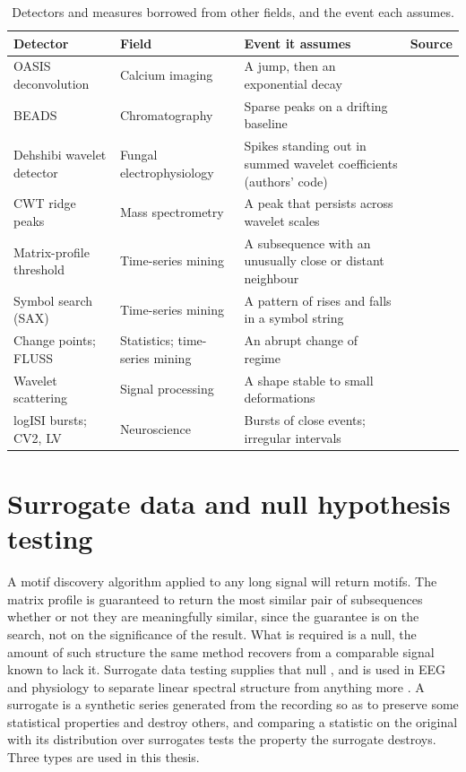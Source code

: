 \begin{table}[htbp]
\caption[{Detectors and measures borrowed from other fields.}]{Detectors and measures borrowed from other fields, and the event each assumes.}
\label{tab:litdetectors}
\footnotesize
\begin{tabularx}{\textwidth}{@{}>{\raggedright\arraybackslash}p{3.6cm} >{\raggedright\arraybackslash}p{3.0cm} X l@{}}
\toprule
\textbf{Detector} & \textbf{Field} & \textbf{Event it assumes} & \textbf{Source}\\
\midrule
OASIS deconvolution & Calcium imaging & A jump, then an exponential decay & \cite{friedrich2017oasis}\\
BEADS & Chromatography & Sparse peaks on a drifting baseline & \cite{ning2014beads}\\
Dehshibi wavelet detector & Fungal electrophysiology & Spikes standing out in summed wavelet coefficients (authors' code) & \cite{dehshibi,dehshibi2020code}\\
CWT ridge peaks & Mass spectrometry & A peak that persists across wavelet scales & \cite{du2006cwt}\\
Matrix-profile threshold & Time-series mining & A subsequence with an unusually close or distant neighbour & \cite{yeh}\\
Symbol search (SAX) & Time-series mining & A pattern of rises and falls in a symbol string & \cite{lin2007sax}\\
Change points; FLUSS & Statistics; time-series mining & An abrupt change of regime & \cite{truong2020ruptures,gharghabi2017fluss}\\
Wavelet scattering & Signal processing & A shape stable to small deformations & \cite{bruna2013scattering}\\
logISI bursts; CV2, LV & Neuroscience & Bursts of close events; irregular intervals & \cite{pasquale2010logisi,holt1996cv2,shinomoto2003lv}\\
\bottomrule
\end{tabularx}
\end{table}


\section{Surrogate data and null hypothesis testing}
\label{sec:litsurrogates}
\label{sec:surrogates}

A motif discovery algorithm applied to any long signal will return motifs. The matrix profile is guaranteed to return the most similar pair of subsequences whether or not they are meaningfully similar, since the guarantee is on the search, not on the significance of the result. What is required is a null, the amount of such structure the same method recovers from a comparable signal known to lack it. Surrogate data testing supplies that null \cite{theiler1992surrogate}, and is used in EEG and physiology to separate linear spectral structure from anything more \cite{schreiber1996iaaft,schreiber2000surrogate}. A surrogate is a synthetic series generated from the recording so as to preserve some statistical properties and destroy others, and comparing a statistic on the original with its distribution over surrogates tests the property the surrogate destroys. Three types are used in this thesis.

